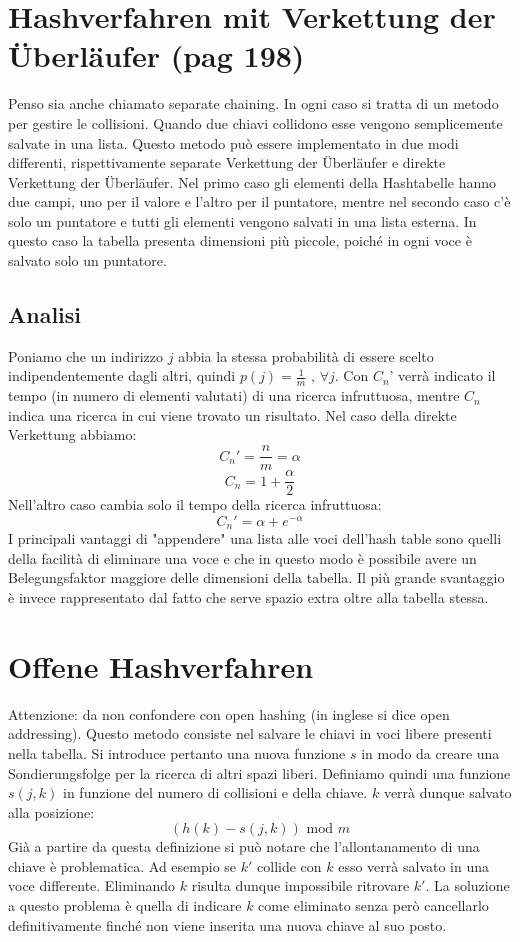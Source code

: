 \documentclass[a4paper]{book}
\begin{document}
\section{Hashverfahren mit Verkettung der Überläufer (pag 198)}
Penso sia anche chiamato separate chaining. In ogni caso si tratta di un metodo per gestire le collisioni. Quando due chiavi collidono esse vengono semplicemente salvate in una lista. Questo metodo può essere implementato in due modi differenti, rispettivamente separate Verkettung der Überläufer e direkte Verkettung der Überläufer. Nel primo caso gli elementi della Hashtabelle hanno due campi, uno per il valore e l'altro per il puntatore, mentre nel secondo caso c'è solo un puntatore e tutti gli elementi vengono salvati in una lista esterna. In questo caso la tabella presenta dimensioni più piccole, poiché in ogni voce è salvato solo un puntatore.
\subsection*{Analisi}
Poniamo che un indirizzo $j$ abbia la stessa probabilità di essere scelto indipendentemente dagli altri, quindi $p(j)=\frac{1}{m} \mbox{ , } \forall j$. Con $C_n$' verrà indicato il tempo (in numero di elementi valutati) di una ricerca infruttuosa, mentre $C_n$ indica una ricerca in cui viene trovato un risultato. Nel caso della direkte Verkettung abbiamo:
$$ C_n '=\frac{n}{m}=\alpha $$
$$ C_n = 1+\frac{\alpha}{2} $$
Nell'altro caso cambia solo il tempo della ricerca infruttuosa:
$$C_n '=\alpha + e^{-\alpha} $$
I principali vantaggi di "appendere" una lista alle voci dell'hash table sono quelli della facilità di eliminare una voce e che in questo modo è possibile avere un Belegungsfaktor maggiore delle dimensioni della tabella. Il più grande svantaggio è invece rappresentato dal fatto che serve spazio extra oltre alla tabella stessa.
\section{Offene Hashverfahren}
Attenzione: da non confondere con open hashing (in inglese si dice open addressing). Questo metodo consiste nel salvare le chiavi in voci libere presenti nella tabella. Si introduce pertanto una nuova funzione $s$ in modo da creare una Sondierungsfolge per la ricerca di altri spazi liberi. Definiamo quindi una funzione $s(j,k)$ in funzione del numero di collisioni e della chiave. $k$ verrà dunque salvato alla posizione:
$$(h(k)-s(j,k))\mbox{ mod }m$$
Già a partire da questa definizione si può notare che l'allontanamento di una chiave è problematica. Ad esempio se $k'$ collide con $k$ esso verrà salvato in una voce differente. Eliminando $k$ risulta dunque impossibile ritrovare $k'$. La soluzione a questo problema è quella di indicare $k$ come eliminato senza però cancellarlo definitivamente finché non viene inserita una nuova chiave al suo posto.
\end{document}
